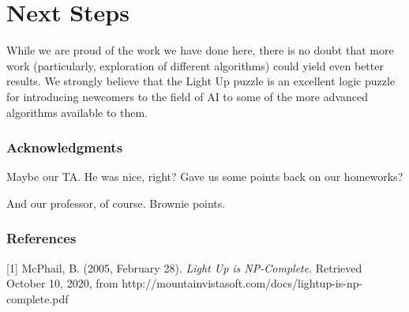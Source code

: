 \documentclass{article} %
\begin{document}
\section{Next Steps}

While we are proud of the work we have done here, there is no doubt that more work (particularly, exploration of different algorithms) could yield even better results. We strongly believe that the Light Up puzzle is an excellent logic puzzle for introducing newcomers to the field of AI to some of the more advanced algorithms available to them.

\newpage

\subsubsection*{Acknowledgments}

Maybe our TA. He was nice, right? Gave us some points back on our homeworks?

And our professor, of course. Brownie points.

\subsubsection*{References}

\small{
[1] McPhail, B. (2005, February 28). \textit{Light Up is NP-Complete}. Retrieved October 10, 2020, from http://mountainvistasoft.com/docs/lightup-is-np-complete.pdf
}
\end{document}

